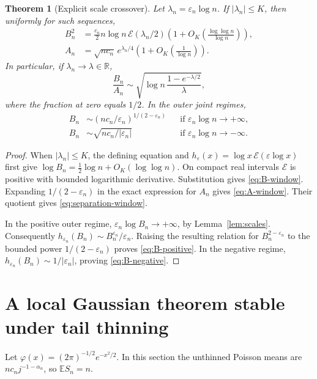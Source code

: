 \documentclass[11pt,a4paper]{article}
\numberwithin{equation}{section}
\newtheorem{theorem}{Theorem}[section]
\theoremstyle{definition}
\theoremstyle{remark}
\newcommand{\R}{\mathbb R}
\newcommand{\E}{\mathbb E}
\newcommand{\eps}{\varepsilon}
\newcommand{\ph}{\varphi}
\newcommand{\cE}{\mathcal E}
\begin{document}
\begin{theorem}[Explicit scale crossover]
\label{thm:scale-crossover}
Let \(\lambda_n=\eps_n\log n\). If \(|\lambda_n|\le K\), then uniformly
for such sequences,
\begin{align}
 B_n^2&=\frac{c_n}{2}n\log n\,\cE(\lambda_n/2)
       \left(1+O_K\left(\frac{\log\log n}{\log n}\right)\right),
       \label{eq:B-window}\\
 A_n&=\sqrt{nc_n}\,e^{\lambda_n/4}
       \left(1+O_K\left(\frac1{\log n}\right)\right).
       \label{eq:A-window}
\end{align}
In particular, if \(\lambda_n\to\lambda\in\R\),
\begin{equation}
 \frac{B_n}{A_n}\sim
 \sqrt{\log n\,\frac{1-e^{-\lambda/2}}{\lambda}},
 \label{eq:separation-window}
\end{equation}
where the fraction at zero equals \(1/2\). In the outer joint regimes,
\begin{align}
 B_n&\sim(nc_n/\eps_n)^{1/(2-\eps_n)}
 &&\text{if }\eps_n\log n\to+\infty, \label{eq:B-positive}\\
 B_n&\sim\sqrt{nc_n/|\eps_n|}
 &&\text{if }\eps_n\log n\to-\infty. \label{eq:B-negative}
\end{align}
\end{theorem}
\begin{proof}
When \(|\lambda_n|\le K\), the defining equation and
\(h_\eps(x)=\log x\,\cE(\eps\log x)\) first give
\(\log B_n=\tfrac12\log n+O_K(\log\log n)\). On compact real intervals
\(\cE\) is positive with bounded logarithmic derivative. Substitution gives
\eqref{eq:B-window}. Expanding \(1/(2-\eps_n)\) in the exact expression for
\(A_n\) gives \eqref{eq:A-window}. Their quotient gives
\eqref{eq:separation-window}.

In the positive outer regime, \(\eps_n\log B_n\to+\infty\), by
Lemma~\ref{lem:scales}. Consequently
\(h_{\eps_n}(B_n)\sim B_n^{\eps_n}/\eps_n\). Raising the resulting
relation for \(B_n^{2-\eps_n}\) to the bounded power \(1/(2-\eps_n)\)
proves \eqref{eq:B-positive}. In the negative regime,
\(h_{\eps_n}(B_n)\sim1/|\eps_n|\), proving \eqref{eq:B-negative}.
\end{proof}

\section{A local Gaussian theorem stable under tail thinning}
\label{sec:llt}
Let \(\ph(x)=(2\pi)^{-1/2}e^{-x^2/2}\). In this section the unthinned
Poisson means are \(nc_nj^{-1-\alpha_n}\), so \(\E S_n=n\).
\end{document}
